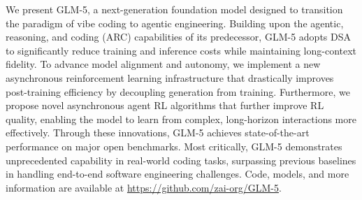 \vspace{-0.5em}

We present GLM-5, a next-generation foundation model designed to transition the paradigm of vibe coding to agentic engineering.
 Building upon the agentic, reasoning, and coding (ARC) capabilities of its predecessor, GLM-5 adopts DSA to significantly reduce training and inference costs while maintaining long-context fidelity. To advance model alignment and autonomy, we implement a new asynchronous reinforcement learning infrastructure that drastically improves post-training efficiency by decoupling generation from training. Furthermore, we propose novel asynchronous agent RL algorithms that further improve RL quality, enabling the model to learn from complex, long-horizon interactions more effectively. Through these innovations, GLM-5 achieves state-of-the-art performance on major open benchmarks. Most critically, GLM-5 demonstrates unprecedented capability in real-world coding tasks, surpassing previous baselines in handling end-to-end software engineering challenges. 
Code, models, and more information are available at \url{https://github.com/zai-org/GLM-5}.


     


